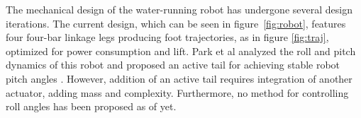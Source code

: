 The mechanical design of the water-running robot has undergone several design iterations. The current design, which can be seen in figure~\ref{fig:robot}, features four four-bar linkage legs producing  foot trajectories, as in figure \ref{fig:traj}, optimized for power consumption and lift. Park et al analyzed the roll and pitch dynamics of this robot and proposed an active tail for achieving stable robot pitch angles \cite{park2010roll}. However, addition of an active tail requires integration of another actuator, adding mass and complexity. Furthermore, no method for controlling roll angles has been proposed as of yet.


